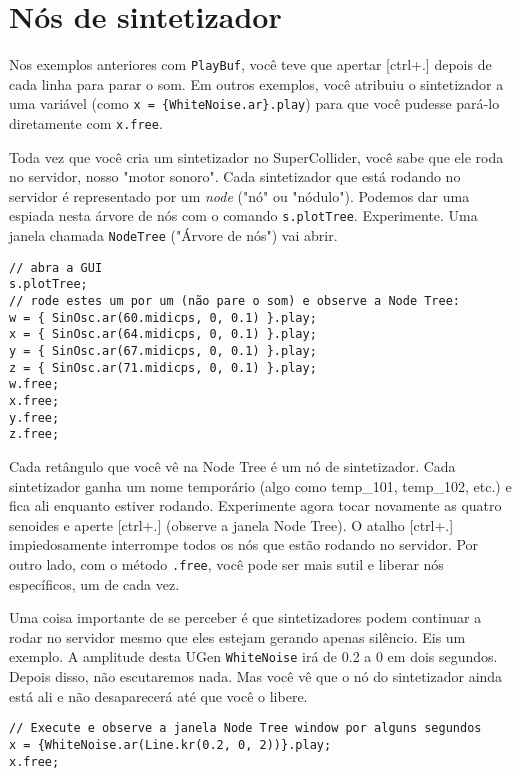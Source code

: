 \section{Nós de sintetizador}

Nos exemplos anteriores com \texttt{PlayBuf}, você teve que apertar [ctrl+.] depois de cada linha para parar o som. Em outros exemplos, você atribuiu o sintetizador a uma variável (como \texttt{x = \{WhiteNoise.ar\}.play}) para que você pudesse pará-lo diretamente com \texttt{x.free}.

Toda vez que você cria um sintetizador no SuperCollider, você sabe que ele roda no servidor, nosso "motor sonoro". Cada sintetizador que está rodando no servidor é representado por um \emph{node} ("nó" ou "nódulo"). Podemos dar uma espiada nesta árvore de nós com o comando \texttt{s.plotTree}. Experimente. Uma janela chamada \texttt{NodeTree} ("Árvore de nós") vai abrir.

 
\begin{lstlisting}[style=SuperCollider-IDE, basicstyle=\scttfamily\footnotesize]
// abra a GUI
s.plotTree;
// rode estes um por um (não pare o som) e observe a Node Tree:
w = { SinOsc.ar(60.midicps, 0, 0.1) }.play;
x = { SinOsc.ar(64.midicps, 0, 0.1) }.play;
y = { SinOsc.ar(67.midicps, 0, 0.1) }.play;
z = { SinOsc.ar(71.midicps, 0, 0.1) }.play;
w.free;
x.free;
y.free;
z.free;
\end{lstlisting}
 

Cada retângulo que você vê na Node Tree é um nó de sintetizador. Cada sintetizador ganha um nome temporário (algo como temp\_101, temp\_102, etc.) e fica ali enquanto estiver rodando. Experimente agora tocar novamente as quatro senoides e aperte [ctrl+.] (observe a janela Node Tree). O atalho [ctrl+.] impiedosamente interrompe todos os nós que estão rodando no servidor. Por outro lado, com o método \texttt{.free}, você pode ser mais sutil e liberar nós específicos, um de cada vez.

Uma coisa importante de se perceber é que sintetizadores podem continuar a rodar no servidor mesmo que eles estejam gerando apenas silêncio. Eis um exemplo. A amplitude desta UGen \texttt{WhiteNoise} irá de 0.2 a 0 em dois segundos. Depois disso, não escutaremos nada. Mas você vê que o nó do sintetizador ainda está ali e não desaparecerá até que você o libere.

 
\begin{lstlisting}[style=SuperCollider-IDE, basicstyle=\scttfamily\footnotesize]
// Execute e observe a janela Node Tree window por alguns segundos
x = {WhiteNoise.ar(Line.kr(0.2, 0, 2))}.play;
x.free;
\end{lstlisting}
 

